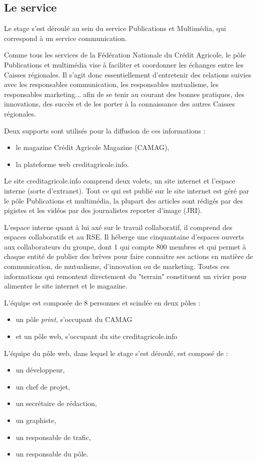 \documentclass[12pt,a4paper]{article}
\begin{document}
\subsection{Le service}
Le stage s'est déroulé au sein du service Publications et Multimédia, qui correspond à un service communication. \par
Comme tous les services de la Fédération Nationale du Crédit Agricole, le pôle Publications et multimédia vise à faciliter et coordonner les échanges entre les Caisses régionales. Il s'agit donc essentiellement d'entretenir des relations suivies avec les responsables communication, les responsables mutualisme, les responsables marketing... afin de se tenir au courant des bonnes pratiques, des innovations, des succès et de les porter à la connaissance des autres Caisses régionales.\par
Deux supports sont utilisés pour la diffusion de ces informations : 
\begin{itemize}
\item le magazine Crédit Agricole Magazine (CAMAG),
\item la plateforme web creditagricole.info.
\end{itemize}\par 
Le site creditagricole.info comprend deux volets, un site internet et l'espace interne (sorte d'extranet). Tout ce qui est publié sur le site internet est géré par le pôle Publications et multimédia, la plupart des articles sont rédigés par des pigistes et les vidéos par des journalistes reporter d'image (JRI).\par
L'espace interne quant à lui axé sur le travail collaboratif, il comprend des espaces collaboratifs et au RSE. Il héberge une cinquantaine d'espaces ouverts aux collaborateurs du groupe, dont 1 qui compte 800 membres et qui permet à chaque entité de publier des brèves pour faire connaitre ses actions en matière de communication, de mutualisme, d'innovation ou de marketing. Toutes ces informations qui remontent directement du "terrain" constituent un vivier pour alimenter le site internet et le magazine.\par
L'équipe est composée de 8 personnes et scindée en deux pôles :
\begin{itemize}
\item un pôle \textit{print}, s'occupant du CAMAG
\item et un pôle web, s'occupant du site creditagricole.info
\end{itemize}
L'équipe du pôle web, dans lequel le stage s'est déroulé, est composé de :
\begin{itemize}
\item un développeur,
\item un chef de projet,
\item un secrétaire de rédaction,
\item un graphiste,
\item un responsable de trafic,
\item un responsable du pôle.
\end{itemize} 
\end{document}
